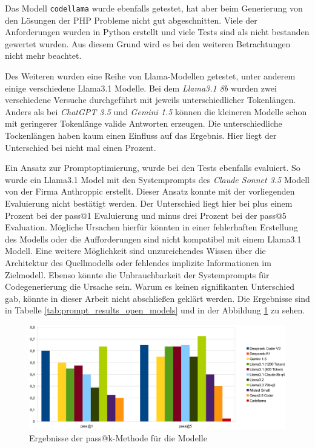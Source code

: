 Das Modell \texttt{codellama} wurde ebenfalls getestet, hat aber beim Generierung von den Lösungen der PHP Probleme nicht gut abgeschnitten. Viele der Anforderungen wurden in Python erstellt und viele Tests sind als nicht bestanden gewertet wurden. Aus diesem Grund wird es bei den weiteren Betrachtungen nicht mehr beachtet.\vspace{0.2cm}

Des Weiteren wurden eine Reihe von Llama-Modellen getestet, unter anderem einige verschiedene Llama3.1 Modelle. Bei dem \textit{Llama3.1 8b} wurden zwei verschiedene Versuche durchgeführt mit jeweils unterschiedlicher Tokenlängen. Anders als bei \textit{ChatGPT 3.5} und \textit{Gemini 1.5} können die kleineren Modelle schon mit geringerer Tokenlänge valide Antworten erzeugen. Die unterschiedliche Tockenlängen haben kaum einen Einfluss auf das Ergebnis. Hier liegt der Unterschied bei nicht mal einen Prozent.\vspace{0.2cm}

Ein Ansatz zur Promptoptimierung, wurde bei den Tests ebenfalls evaluiert. So wurde ein Llama3.1 Model mit den Systemprompts des \textit{Claude Sonnet 3.5} Modell von der Firma Anthroppic erstellt. Dieser Ansatz konnte mit der vorliegenden Evaluierung nicht bestätigt werden. Der Unterschied liegt hier bei plus einem Prozent bei der pass@1 Evaluierung und minus drei Prozent bei der pass@5 Evaluation. Mögliche Ursachen hierfür könnten in einer fehlerhaften Erstellung des Modells oder die Aufforderungen sind nicht kompatibel mit einem Llama3.1 Modell. Eine weitere Möglichkeit sind unzureichendes Wissen über die Architektur des Quellmodells oder fehlendes implizite Informationen im Zielmodell. Ebenso könnte die Unbrauchbarkeit der Systemprompts für Codegenerierung die Ursache sein. Warum es keinen signifikanten Unterschied gab, könnte in dieser Arbeit nicht abschließen geklärt werden. Die Ergebnisse sind in Tabelle \ref{tab:prompt_results_open_models} und in der Abbildung \ref{img:pass_at_k_results_by_llm} zu sehen.\vspace{0.2cm}

\begin{figure}[!ht]
	\includegraphics[width=\textwidth]{content/chapter_evaluation/images/llm_evaluation.eps}
	\centering
	\caption{Ergebnisse der pass@k-Methode für die Modelle}
	\label{img:pass_at_k_results_by_llm}
\end{figure}

